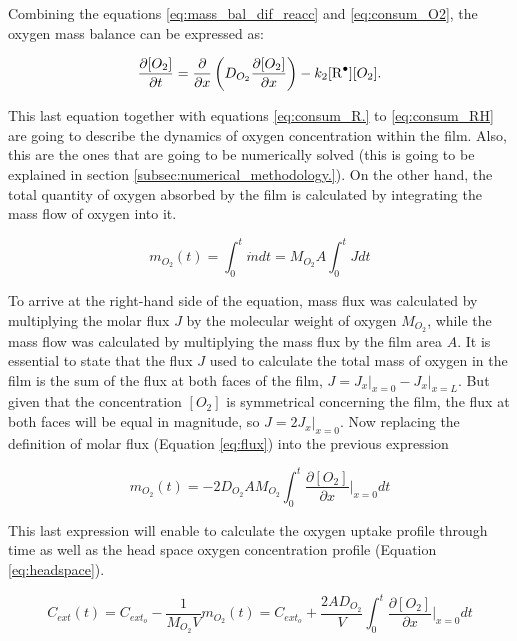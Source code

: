 \begin{refsection}
Combining the equations \ref{eq:mass_bal_dif_reacc} and \ref{eq:consum_O2}, the oxygen mass balance can be expressed as:

\begin{equation}
     \frac{\partial [O_2]}{\partial t}= \frac{\partial}{\partial x} \left(D_{O_2}\frac{\partial [O_2] }{\partial x}\right) -k_2[\ce{R^.}][O_2].
    \label{eq:mass_bal_def}
\end{equation}

This last equation together with equations \ref{eq:consum_R.} to \ref{eq:consum_RH} are going to describe the dynamics of oxygen concentration within the film. Also, this are the ones that are going to be numerically solved (this is going to be explained in section \ref{subsec:numerical_methodology.}). On the other hand, the total quantity of oxygen absorbed by the film is calculated by integrating the mass flow of oxygen into it. 

\begin{equation}
    m_{O_2}(t)= \int_0^t \dot{m}dt =M_{O_2}A\int_0^t Jdt 
\end{equation}

To arrive at the right-hand side of the equation, mass flux was calculated by multiplying the molar flux $J$ by the molecular weight of oxygen $M_{O_2}$, while the mass flow was calculated by multiplying the mass flux by the film area $A$. It is essential to state that the flux $J$ used to calculate the total mass of oxygen in the film is the sum of the flux at both faces of the film, $J= J_x\rvert_{x = 0} - J_x\rvert_{x = L}$. But given that the concentration $[O_2]$ is symmetrical concerning the film, the flux at both faces will be equal in magnitude, so $J=2J_x\rvert_{x = 0}$.  Now replacing the definition of molar flux (Equation \ref{eq:flux}) into the previous expression

\begin{equation}
    m_{O_2}(t) =-2D_{O_2}AM_{O_2}\int_0^t \frac{\partial [O_2]}{\partial x}\biggr\rvert_{x = 0}dt
    \label{eq:total_mass_O2}
\end{equation}

This last expression will enable to calculate the oxygen uptake profile through time as well as the head space oxygen concentration profile (Equation \ref{eq:headspace}). 

\begin{equation}
    C_{ext}(t)= C_{ext_o} - \frac{1}{M_{O_2}V} m_{O_2}(t)= C_{ext_o} + \frac{2AD_{O_2}}{V} \int_0^t \frac{\partial [O_2]}{\partial x}\biggr\rvert_{x = 0}dt
    \label{eq:headspace}
\end{equation}


\end{refsection}
